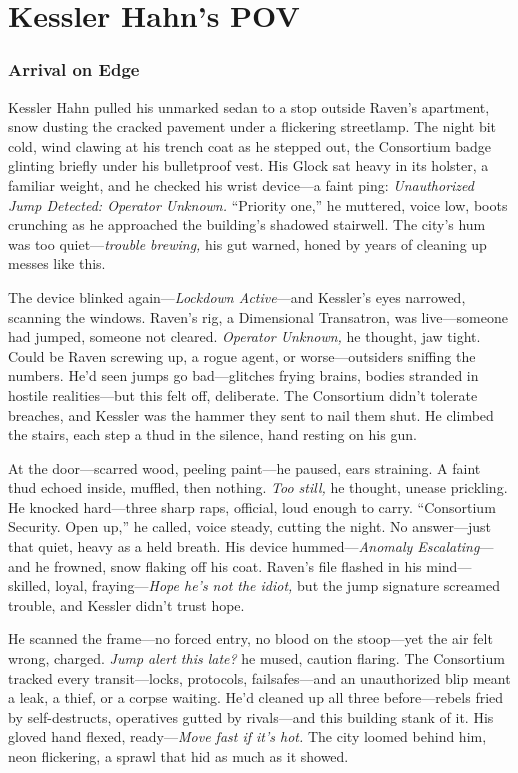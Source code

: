\documentclass[12pt]{book}
\begin{document}
\chapter{Kessler Hahn’s POV}

\subsection{Arrival on Edge}

Kessler Hahn pulled his unmarked sedan to a stop outside Raven’s apartment, snow dusting the cracked pavement under a flickering streetlamp. The night bit cold, wind clawing at his trench coat as he stepped out, the Consortium badge glinting briefly under his bulletproof vest. His Glock sat heavy in its holster, a familiar weight, and he checked his wrist device—a faint ping: \textit{Unauthorized Jump Detected: Operator Unknown.} “Priority one,” he muttered, voice low, boots crunching as he approached the building’s shadowed stairwell. The city’s hum was too quiet—\textit{trouble brewing,} his gut warned, honed by years of cleaning up messes like this.

The device blinked again—\textit{Lockdown Active}—and Kessler’s eyes narrowed, scanning the windows. Raven’s rig, a Dimensional Transatron, was live—someone had jumped, someone not cleared. \textit{Operator Unknown,} he thought, jaw tight. Could be Raven screwing up, a rogue agent, or worse—outsiders sniffing the numbers. He’d seen jumps go bad—glitches frying brains, bodies stranded in hostile realities—but this felt off, deliberate. The Consortium didn’t tolerate breaches, and Kessler was the hammer they sent to nail them shut. He climbed the stairs, each step a thud in the silence, hand resting on his gun.

At the door—scarred wood, peeling paint—he paused, ears straining. A faint thud echoed inside, muffled, then nothing. \textit{Too still,} he thought, unease prickling. He knocked hard—three sharp raps, official, loud enough to carry. “Consortium Security. Open up,” he called, voice steady, cutting the night. No answer—just that quiet, heavy as a held breath. His device hummed—\textit{Anomaly Escalating}—and he frowned, snow flaking off his coat. Raven’s file flashed in his mind—skilled, loyal, fraying—\textit{Hope he’s not the idiot,} but the jump signature screamed trouble, and Kessler didn’t trust hope.

He scanned the frame—no forced entry, no blood on the stoop—yet the air felt wrong, charged. \textit{Jump alert this late?} he mused, caution flaring. The Consortium tracked every transit—locks, protocols, failsafes—and an unauthorized blip meant a leak, a thief, or a corpse waiting. He’d cleaned up all three before—rebels fried by self-destructs, operatives gutted by rivals—and this building stank of it. His gloved hand flexed, ready—\textit{Move fast if it’s hot.} The city loomed behind him, neon flickering, a sprawl that hid as much as it showed.
\end{document}
